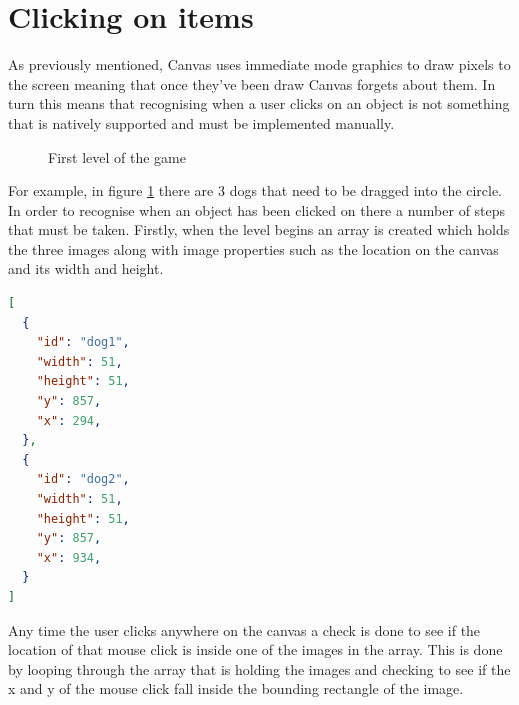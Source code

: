 \documentclass[12pt,a4paper]{report}
\begin{document}
\section{Clicking on items}
As previously mentioned, Canvas uses immediate mode graphics to draw pixels to the screen meaning that once they've been draw Canvas forgets about them. In turn this means that recognising when a user clicks on an object is not something that is natively supported  and must be implemented manually. 

\begin{figure}[h]
  \centering
  \begin{minipage}[b]{1\textwidth}
    \caption{First level of the game}
    \label{fig:selectDogs}
  \end{minipage}
\end{figure}
\FloatBarrier

For example, in figure \ref{fig:selectDogs} there are 3 dogs that need to be dragged into the circle. In order to recognise when an object has been clicked on there a number of steps that must be taken. Firstly, when the level begins an array is created which holds the three images along with image properties such as the location on the canvas and its width and height.

\begin{lstlisting}[language=json]
[
  {
    "id": "dog1",
    "width": 51,
    "height": 51,
    "y": 857,
    "x": 294,
  },
  {
    "id": "dog2",
    "width": 51,
    "height": 51,
    "y": 857,
    "x": 934,
  }
]
\end{lstlisting}

Any time the user clicks anywhere on the canvas a check is done to see if the location of that mouse click is inside one of the images in the array.
This is done by looping through the array that is holding the images and checking to see if the x and y of the mouse click fall inside the bounding rectangle of the image.
\end{document}
